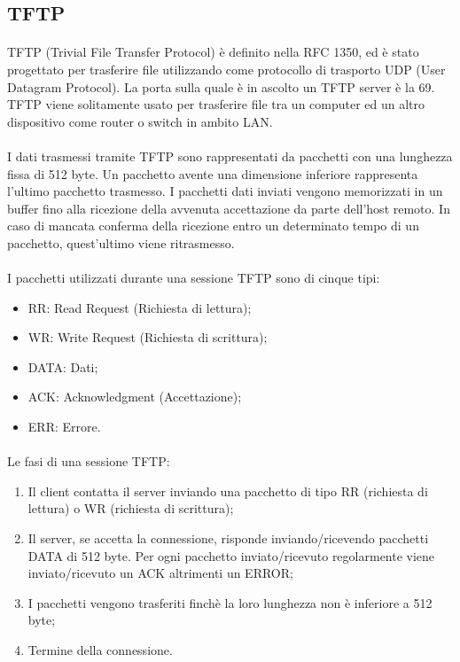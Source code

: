 \subsection{TFTP}
\paragraph{} TFTP (Trivial File Transfer Protocol) è definito nella RFC 1350, ed è stato progettato per trasferire file utilizzando come protocollo di trasporto UDP (User Datagram Protocol). La porta sulla quale è in ascolto un TFTP server è la 69. TFTP viene solitamente usato per trasferire file tra un computer ed un altro dispositivo come router o switch in ambito LAN.

\paragraph{} I dati trasmessi tramite TFTP sono rappresentati da pacchetti con una lunghezza fissa di 512 byte. Un pacchetto avente una dimensione inferiore rappresenta l'ultimo pacchetto trasmesso. I pacchetti dati inviati vengono memorizzati in un buffer fino alla ricezione della avvenuta accettazione da parte dell'host remoto. In caso di mancata conferma della ricezione entro un determinato tempo di un pacchetto, quest'ultimo viene ritrasmesso. 

\paragraph{} I pacchetti utilizzati durante una sessione TFTP sono di cinque tipi: 
\begin{itemize}
	\item RR: Read Request (Richiesta di lettura); 
	\item WR: Write Request (Richiesta di scrittura);
	\item DATA: Dati;
	\item ACK: Acknowledgment (Accettazione);
	\item ERR: Errore.
\end{itemize}

\paragraph{} Le fasi di una sessione TFTP:  
\begin{enumerate}
	\item Il client contatta il server inviando una pacchetto di tipo RR (richiesta di lettura) o WR (richiesta di scrittura);  
	\item Il server, se accetta la connessione, risponde inviando/ricevendo pacchetti DATA di 512 byte. Per ogni pacchetto inviato/ricevuto regolarmente viene inviato/ricevuto un ACK altrimenti un ERROR; 
	\item I pacchetti vengono trasferiti finchè la loro lunghezza non è inferiore a 512 byte;  
	\item Termine della connessione. 
\end{enumerate}

